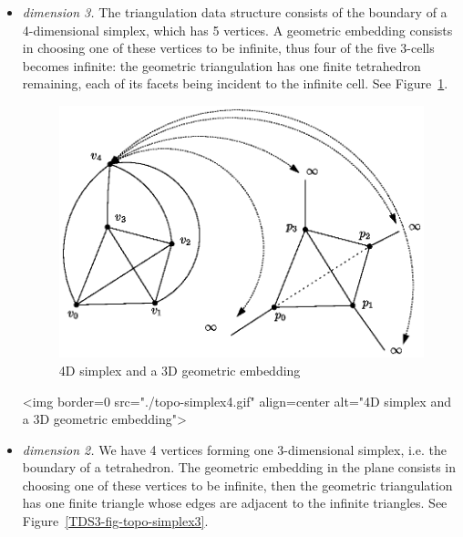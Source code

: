\begin{itemize}
\item \emph{dimension 3.} The triangulation data structure consists of
the boundary of a 4-dimensional simplex, which has 5 vertices. A
geometric embedding consists in choosing one of these vertices to be
infinite, thus four of the five 3-cells becomes infinite: the geometric
triangulation has one finite tetrahedron remaining, each of its facets
being incident to the infinite cell. See Figure~\ref{TDS3-fig-topo-simplex4}.
\begin{ccTexOnly}
\begin{figure}
\begin{center} 
\includegraphics{topo-simplex4.eps}
\end{center}
\caption{4D simplex and a 3D geometric embedding \label{TDS3-fig-topo-simplex4}}
\end{figure} 
\end{ccTexOnly}
\begin{ccHtmlOnly}
<img border=0 src="./topo-simplex4.gif" align=center
alt="4D simplex and a 3D geometric embedding">
\end{ccHtmlOnly}
\item \emph{dimension 2.} We have 4 vertices forming one 3-dimensional
simplex, i.e. the boundary of a tetrahedron. The geometric embedding in
the plane consists in choosing one of these vertices to be infinite,
then the geometric triangulation has one finite triangle whose edges are
adjacent to the infinite triangles. See Figure~\ref{TDS3-fig-topo-simplex3}.
\begin{ccTexOnly}
\begin{figure}
\begin{center} 

\end{center}
\end{figure}
\end{ccTexOnly}
\end{itemize}
